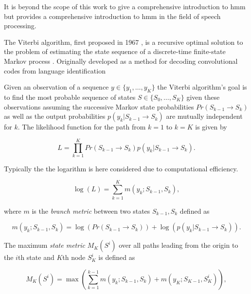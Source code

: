It is beyond the scope of this work to give a comprehensive introduction to \gls{hmm} but \cite{Rabiner1989} provides a comprehensive introduction to \gls{hmm} in the field of speech processing.

The Viterbi algorithm, first proposed in 1967 \cite{Viterbi1967}, is a recursive optimal solution to the problem of estimating the state sequence of a discrete-time finite-state Markov process \cite{Forney1973}. Originally developed as a method for decoding convolutional codes
from language identification \cite{Nagarajan2004}

Given an observation of a sequence $y \in \{y_1,\ldots,y_K\}$ the Viterbi algorithm's goal is to find the most probable sequence of states $S \in \{S_0,\ldots,S_K \}$ given these observations assuming the successive Markov state probabilities $Pr(S_{k-1} \rightarrow S_{k})$ as well as the output probabilities $p(y_k | S_{k-1} \rightarrow S_{k})$ are mutually independent for $k$. The likelihood function for the path from $k=1$ to $k=K$ is given by

\begin{equation}\label{eq:viterbiLitRev}
L = \prod_{k=1}^K Pr(S_{k-1} \rightarrow S_{k}) p(y_k | S_{k-1} \rightarrow S_{k}).
\end{equation}

Typically the the logarithm is here considered due to computational efficiency.

\begin{equation}\label{eq:viterbiLitRev2}
\log{\left(L\right)} = \sum_{k=1}^K m(y_k ; S_{k-1}, S_{k}),
\end{equation}

where $m$ is the \emph{branch metric} between two states $S_{k-1}, S_{k}$ defined as

\begin{equation}\label{eq:viterbiLitRev3}
m(y_k ; S_{k-1}, S_{k}) = \log{\left( Pr(S_{k-1} \rightarrow S_{k}) \right)} + \log{\left( p(y_k | S_{k-1} \rightarrow S_{k}) \right)}.
\end{equation}

The maximum \emph{state metric} $M_K(S^i)$ over all paths leading from the origin to the $i$th state and $K$th node $S_K^i$ is defined as

\begin{equation}\label{eq:viterbiLitRev4}
M_K(S^i) = \max \left( \sum_{k=1}^{k-1} m(y_k ; S_{k-1}, S_{k}) + m(y_K ; S_{K-1}, S_{K}^i)\right),
\end{equation}

